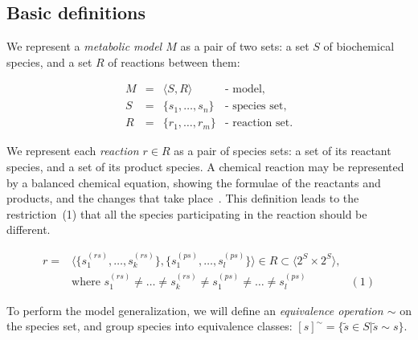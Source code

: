 \documentclass[9pt]{article}
\newcounter{def}
\newcounter{rm}
\begin{document}
\subsection*{Basic definitions}

We represent a \emph{metabolic model $M$} as a pair of two sets: a set $S$ of biochemical species, and a set $R$ of reactions between them: 

\[ \begin{array}{ccll}
\mbox{$M$} & \mbox{$=$} & \mbox{$\langle S, R \rangle$} & \mbox{- model,} \\
\mbox{$S$} & \mbox{$=$} & \mbox{$\{s_1, \ldots, s_n\}$} &  \mbox{- species set,} \\
\mbox{$R$} & \mbox{$=$} & \mbox{$\{r_1, \ldots, r_m\}$} &  \mbox{- reaction set.} 
\end{array} \]

We represent each \emph{reaction $r \in R$} as a pair of species sets: a set of its reactant species, and a set of its product species. A chemical reaction may be represented by a balanced chemical equation, showing the formulae of the reactants and products, and the changes that take place~\citep{Clugston2000}. This definition leads to the restriction~(1) that all the species participating in the reaction should be different.

\[ \begin{array}{llr}
\mbox{$r = $} & \mbox{$\langle\{s^{(rs)}_1, \ldots, s^{(rs)}_k\},\{s^{(ps)}_1, \ldots, s^{(ps)}_l\}\rangle
\in R \subset \langle 2^S \times 2^S \rangle$}, &\\
& \mbox{where } \mbox{$s^{(rs)}_1 \neq \ldots \neq s^{(rs)}_k \neq s^{(ps)}_1 \neq \ldots \neq s^{(ps)}_l$}  & (1)
\end{array} \]

To perform the model generalization, we will define an \emph{equivalence operation $\sim$} on the species set, and group species into equivalence classes: $[s]^{\sim} = \{\tilde{s} \in S | \tilde{s} \sim s\}$.
\end{document}
